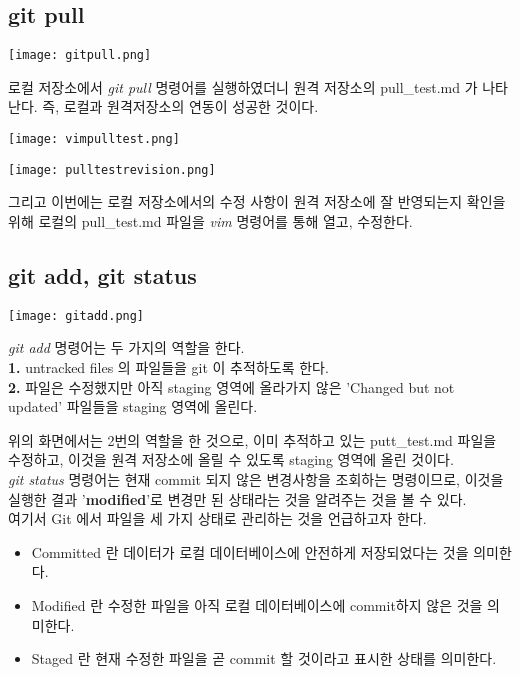 \documentclass[11pt]{article}
\begin{document}
	\subsection{git pull}
	\begin{center}\texttt{[image: gitpull.png]}\end{center}
	로컬 저장소에서 \textit{git pull} 명령어를 실행하였더니 원격 저장소의 pull\_test.md 가 나타난다. 즉, 로컬과 원격저장소의 연동이 성공한 것이다.
	
	\begin{center}\texttt{[image: vimpulltest.png]}\end{center}
	\begin{center}\texttt{[image: pulltestrevision.png]}\end{center}
	그리고 이번에는 로컬 저장소에서의 수정 사항이 원격 저장소에 잘 반영되는지 확인을 위해 로컬의 pull\_test.md 파일을 \textit{vim} 명령어를 통해 열고, 수정한다.
	
	
	\subsection{git add, git status}
	\begin{center}\texttt{[image: gitadd.png]}\end{center}
	\textit{git add} 명령어는 두 가지의 역할을 한다.
	\\\textbf{1.} untracked files 의 파일들을 git 이 추적하도록 한다.
	\\\textbf{2.} 파일은 수정했지만 아직 staging 영역에 올라가지 않은 'Changed but not updated' 파일들을 staging 영역에 올린다.
	
	위의 화면에서는 2번의 역할을 한 것으로, 이미 추적하고 있는 putt\_test.md 파일을 수정하고, 이것을 원격 저장소에 올릴 수 있도록 staging 영역에 올린 것이다. \\\textit{git status} 명령어는 현재 commit 되지 않은 변경사항을 조회하는 명령이므로, 이것을 실행한 결과 '\textbf{modified}'로 변경만 된 상태라는 것을 알려주는 것을 볼 수 있다.
	\\여기서 Git 에서 파일을 세 가지 상태로 관리하는 것을 언급하고자 한다. 
	\begin{itemize}\item Committed 란 데이터가 로컬 데이터베이스에 안전하게 저장되었다는 것을 의미한다. 
	\item Modified 란 수정한 파일을 아직 로컬 데이터베이스에 commit하지 않은 것을 의미한다.
	\item Staged 란 현재 수정한 파일을 곧 commit 할 것이라고 표시한 상태를 의미한다. 
	\end{itemize}
	
\end{document}

